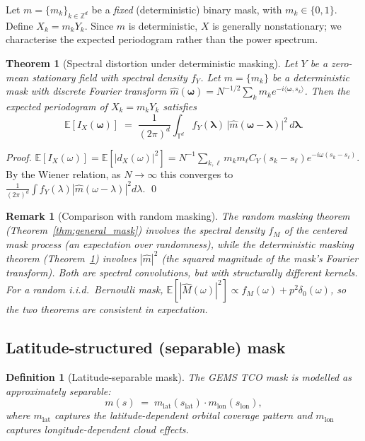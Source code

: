 \documentclass[12pt]{article}
\newtheorem{theorem}{Theorem}
\newtheorem{remark}{Remark}
\newtheorem{definition}{Definition}
\begin{document}
Let $m = \{m_k\}_{k\in\mathbb{Z}^d}$ be a \emph{fixed} (deterministic)
binary mask, with $m_k \in \{0, 1\}$.
Define $X_k = m_k Y_k$.
Since $m$ is deterministic, $X$ is generally nonstationary; we
characterise the expected periodogram rather than the power spectrum.

\begin{theorem}[Spectral distortion under deterministic masking]
\label{thm:deterministic_mask}
Let $Y$ be a zero-mean stationary field with spectral density $f_Y$.
Let $m = \{m_k\}$ be a deterministic mask with discrete Fourier
transform $\hat{m}(\boldsymbol{\omega})
= N^{-1/2}\sum_k m_k e^{-i\langle\boldsymbol{\omega},s_k\rangle}$.
Then the expected periodogram of $X_k = m_k Y_k$ satisfies
\[
\boxed{
    \mathbb{E}[I_X(\boldsymbol{\omega})]
    \;=\; \frac{1}{(2\pi)^d}
          \int_{\mathbb{T}^d}
          f_Y(\boldsymbol{\lambda})\,
          \bigl|\hat{m}(\boldsymbol{\omega} - \boldsymbol{\lambda})\bigr|^2
          \,d\boldsymbol{\lambda}.
}
\]
\end{theorem}

\begin{proof}
$\mathbb{E}[I_X(\omega)] = \mathbb{E}[|d_X(\omega)|^2]
= N^{-1}\sum_{k,\ell} m_k m_\ell C_Y(s_k-s_\ell) e^{-i\omega(s_k-s_\ell)}$.
By the Wiener relation, as $N\to\infty$ this converges to
$\frac{1}{(2\pi)^d}\int f_Y(\lambda)|\hat{m}(\omega-\lambda)|^2 d\lambda$.
\qed
\end{proof}

\begin{remark}[Comparison with random masking]
The random masking theorem (Theorem~\ref{thm:general_mask}) involves the
spectral density $f_M$ of the \emph{centered} mask process (an
expectation over randomness), while the deterministic masking theorem
(Theorem~\ref{thm:deterministic_mask}) involves $|\hat{m}|^2$ (the
squared magnitude of the mask's Fourier transform).
Both are spectral convolutions, but with structurally different kernels.
For a random i.i.d.\ Bernoulli mask,
$\mathbb{E}[|\hat{M}(\omega)|^2] \propto f_M(\omega) + p^2 \delta_0(\omega)$,
so the two theorems are consistent in expectation.
\end{remark}

\subsection{Latitude-structured (separable) mask}
\label{sec:lat_mask}

\begin{definition}[Latitude-separable mask]
\label{def:lat_mask}
The GEMS TCO mask is modelled as approximately separable:
\[
    m(s) \;=\; m_{\mathrm{lat}}(s_{\mathrm{lat}})\cdot
                m_{\mathrm{lon}}(s_{\mathrm{lon}}),
\]
where $m_{\mathrm{lat}}$ captures the latitude-dependent orbital coverage
pattern and $m_{\mathrm{lon}}$ captures longitude-dependent cloud effects.
\end{definition}
\end{document}

